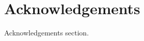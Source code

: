 \documentclass[../main.tex]{subfiles}
\begin{document}
    \section{Acknowledgements}
    Acknowledgements section.
\end{document}
